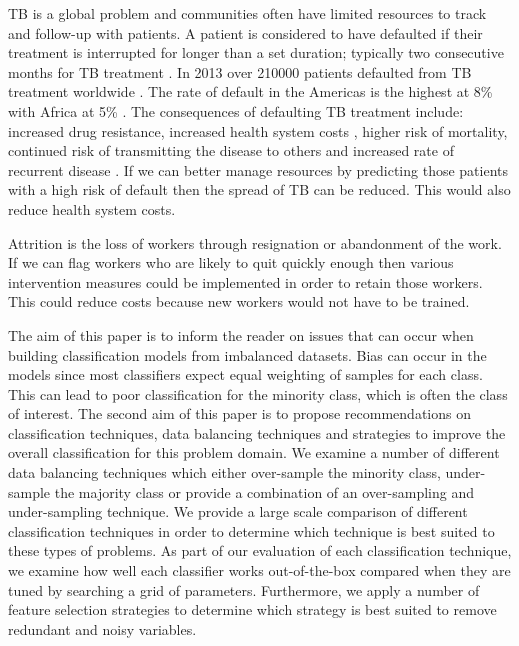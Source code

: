 \documentclass{sig-alternate-05-2015}
\begin{document}
	TB is a global problem and communities often have limited resources to track and follow-up with patients. A patient is considered to have defaulted if their treatment is interrupted for longer than a set duration; typically two consecutive months for TB treatment \cite{world2015TB}. In 2013 over 210\hspace*{1mm}000 patients defaulted from TB treatment worldwide \cite{world2015TB}. The rate of default in the Americas is the highest at 8\% with Africa at 5\% \cite{world2015TB}. The consequences of defaulting TB treatment include: increased drug resistance, increased health system costs \cite{Lackey:10356751520150601, muture:6660173120110101}, higher risk of mortality, continued risk of transmitting the disease to others \cite{Lackey:10356751520150601} and increased rate of recurrent disease \cite{Jha:10.1371/journal.pone.0008873}. If we can better manage resources by predicting those patients with a high risk of default then the spread of TB can be reduced. This would also reduce health system costs.
	
	Attrition is the loss of workers through resignation or abandonment of the work. If we can flag workers who are likely to quit quickly enough then various intervention measures could be implemented in order to retain those workers. This could reduce costs because new workers would not have to be trained.
	
	The aim of this paper is to inform the reader on issues that can occur when building classification models from imbalanced datasets. Bias can occur in the models since most classifiers expect equal weighting of samples for each class. This can lead to poor classification for the minority class, which is often the class of interest. The second aim of this paper is to propose recommendations on classification techniques, data balancing techniques and strategies to improve the overall classification for this problem domain. We examine a number of different data balancing techniques which either over-sample the minority class, under-sample the majority class or provide a combination of an over-sampling and under-sampling technique. We provide a large scale comparison of different classification techniques in order to determine which technique is best suited to these types of problems. As part of our evaluation of each classification technique, we examine how well each classifier works out-of-the-box compared when they are tuned by searching a grid of parameters. Furthermore, we apply a number of feature selection strategies to determine which strategy is best suited to remove redundant and noisy variables.
	
\end{document}
